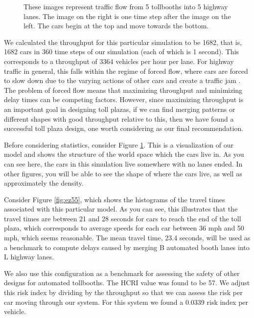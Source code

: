 \documentclass[a4paper, 11pt]{article}
\begin{document}
\begin{figure}[H]
\begin{center}
\begin{tabular}{c c}
\end{tabular}
\end{center}
\caption{These images represent traffic flow from 5 tollbooths into 5 highway lanes. The image on the right is one time step after the image on the left. The cars begin at the top and move towards the bottom.}
\label{fig:5By5}
\end{figure}

We calculated the throughput for this particular simulation to be 1682, that is, 1682 cars in 360 time steps of our simulation (each of which is 1 second). This corresponds to a throughput of 3364 vehicles per hour per lane. For highway traffic in general, this falls within the regime of forced flow, where cars are forced to slow down due to the varying actions of other cars and create a traffic jam \cite{herman}. The problem of forced flow means that maximizing throughput and minimizing delay times can be competing factors. However, since maximizing throughput is an important goal in designing toll plazas, if we can find merging patterns or different shapes with good throughput relative to this, then we have found a successful toll plaza design, one worth considering as our final recommendation.




%
%

Before considering statistics, consider Figure \ref{fig:5By5}. This is a visualization of our model and shows the structure of the world space which the cars live in. As you can see here, the cars in this simulation live somewhere with no lanes ended. In other figures, you will be able to see the shape of where the cars live, as well as approximately the density. 

Consider Figure \ref{fig:ez55}, which shows the histograms of the travel times associated with this particular model. As you can see, this illustrates that the travel times are between 21 and 28 seconds for cars to reach the end of the toll plaza, 
which corresponds to average speeds for each car between 36 mph and 50 mph, which seems reasonable. %
The mean travel time, 23.4 seconds, will be used as a benchmark to compute delays caused by merging B automated booth lanes into L highway lanes. 

We also use this configuration as a benchmark for assessing the safety of other designs for automated tollbooths. 
The HCRI value was found to be 57. We adjust this risk index by dividing by the throughput so that we can assess the risk per car moving through our system. For this system we found a 0.0339 risk index per vehicle. 
\end{document}
